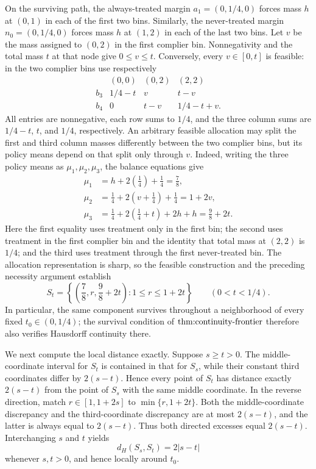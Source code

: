 On the surviving path, the always-treated margin \(a_1=(0,1/4,0)\) forces mass \(h\) at \((0,1)\) in each of the first two bins.  Similarly, the never-treated margin \(n_0=(0,1/4,0)\) forces mass \(h\) at \((1,2)\) in each of the last two bins.  Let \(v\) be the mass assigned to \((0,2)\) in the first complier bin.  Nonnegativity and the total mass \(t\) at that node give \(0\le v\le t\).  Conversely, every \(v\in[0,t]\) is feasible: in the two complier bins use respectively
\[
\begin{array}{c|ccc}
 & (0,0)&(0,2)&(2,2)\\ \hline
 b_3&1/4-t&v&t-v\\
 b_4&0&t-v&1/4-t+v.
\end{array}
\]
All entries are nonnegative, each row sums to \(1/4\), and the three column sums are \(1/4-t\), \(t\), and \(1/4\), respectively.  An arbitrary feasible allocation may split the first and third column masses differently between the two complier bins, but its policy means depend on that split only through \(v\).  Indeed, writing the three policy means as \(\mu_1,\mu_2,\mu_3\), the balance equations give
\[
\begin{aligned}
\mu_1
 &=h+2\left(\frac14\right)+\frac14
 =\frac78,\\
\mu_2
 &=\frac14+2\left(v+\frac14\right)+\frac14
 =1+2v,\\
\mu_3
 &=\frac14+2\left(\frac14+t\right)+2h+h
 =\frac98+2t.
\end{aligned}
\]
Here the first equality uses treatment only in the first bin; the second uses treatment in the first complier bin and the identity that total mass at \((2,2)\) is \(1/4\); and the third uses treatment through the first never-treated bin.  The allocation representation is sharp, so the feasible construction and the preceding necessity argument establish
\[
S_t=\left\{\left(\frac78,r,\frac98+2t\right):1\le r\le1+2t\right\}
\qquad (0<t<1/4).
\tag{1}
\]
In particular, the same component survives throughout a neighborhood of every fixed \(t_0\in(0,1/4)\); the survival condition of \(\textnormal{thm:continuity-frontier}\) therefore also verifies Hausdorff continuity there.

We next compute the local distance exactly.  Suppose \(s\ge t>0\).  The middle-coordinate interval for \(S_t\) is contained in that for \(S_s\), while their constant third coordinates differ by \(2(s-t)\).  Hence every point of \(S_t\) has distance exactly \(2(s-t)\) from the point of \(S_s\) with the same middle coordinate.  In the reverse direction, match \(r\in[1,1+2s]\) to \(\min\{r,1+2t\}\).  Both the middle-coordinate discrepancy and the third-coordinate discrepancy are at most \(2(s-t)\), and the latter is always equal to \(2(s-t)\).  Thus both directed excesses equal \(2(s-t)\).  Interchanging \(s\) and \(t\) yields
\[
d_H(S_s,S_t)=2|s-t|
\tag{2}
\]
whenever \(s,t>0\), and hence locally around \(t_0\).

